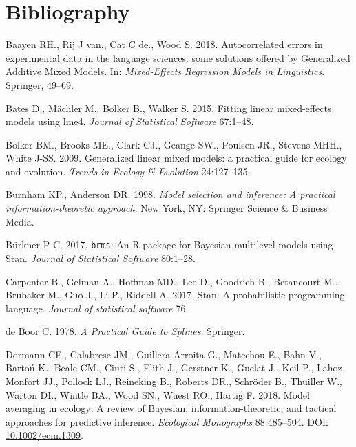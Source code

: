 \documentclass[12pt]{article}
\begin{document}
\FloatBarrier

\section*{Bibliography}\label{bibliography}

\hypertarget{refs}{}
\hypertarget{ref-baayen_autocorrelated_2018}{}
Baayen RH., Rij J van., Cat C de., Wood S. 2018. Autocorrelated errors
in experimental data in the language sciences: some solutions offered by
Generalized Additive Mixed Models. In: \emph{Mixed-Effects Regression
Models in Linguistics}. Springer, 49--69.

\hypertarget{ref-bates_fitting_2015}{}
Bates D., Mächler M., Bolker B., Walker S. 2015. Fitting linear
mixed-effects models using lme4. \emph{Journal of Statistical Software}
67:1--48.

\hypertarget{ref-Bolker:2009cs}{}
Bolker BM., Brooks ME., Clark CJ., Geange SW., Poulsen JR., Stevens
MHH., White J-SS. 2009. Generalized linear mixed models: a practical
guide for ecology and evolution. \emph{Trends in Ecology \& Evolution}
24:127--135.

\hypertarget{ref-burnham_model_1998}{}
Burnham KP., Anderson DR. 1998. \emph{Model selection and inference: A
practical information-theoretic approach}. New York, NY: Springer
Science \& Business Media.

\hypertarget{ref-burkner_brms:_2017}{}
Bürkner P-C. 2017. \texttt{brms}: An R package for Bayesian multilevel
models using Stan. \emph{Journal of Statistical Software} 80:1--28.

\hypertarget{ref-carpenter_stan:_2017}{}
Carpenter B., Gelman A., Hoffman MD., Lee D., Goodrich B., Betancourt
M., Brubaker M., Guo J., Li P., Riddell A. 2017. Stan: A probabilistic
programming language. \emph{Journal of statistical software} 76.

\hypertarget{ref-deBoor:1978wq}{}
de Boor C. 1978. \emph{A Practical Guide to Splines}. Springer.

\hypertarget{ref-dormann_model_2018}{}
Dormann CF., Calabrese JM., Guillera‐Arroita G., Matechou E., Bahn V.,
Bartoń K., Beale CM., Ciuti S., Elith J., Gerstner K., Guelat J., Keil
P., Lahoz‐Monfort JJ., Pollock LJ., Reineking B., Roberts DR., Schröder
B., Thuiller W., Warton DI., Wintle BA., Wood SN., Wüest RO., Hartig F.
2018. Model averaging in ecology: A review of Bayesian,
information-theoretic, and tactical approaches for predictive inference.
\emph{Ecological Monographs} 88:485--504. DOI:
\href{https://doi.org/10.1002/ecm.1309}{10.1002/ecm.1309}.
\end{document}
